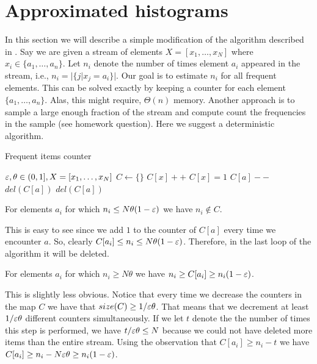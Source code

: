 \documentclass{article}
\begin{document}

\section{Approximated histograms}
In this section we will describe a simple modification of the algorithm described in \cite{Karp03asimple}.
Say we are given a stream of elements $X = [x_1,\ldots,x_N]$ where $x_i \in \{a_1,\ldots,a_n\}$.
Let $n_i$ denote the number of times element $a_i$ appeared in the stream, i.e., $n_i = |\{ j | x_j = a_i \}|$.
Our goal is to estimate $n_i$ for all frequent elements.
This can be solved exactly by keeping a counter for each element $\{a_1,\ldots,a_n\}$. 
Alas, this might require, $\Theta(n)$ memory. 
Another approach is to sample a large enough fraction of
the stream and compute count the frequencies in the sample (see homework question).
Here we suggest a deterministic algorithm.
%
\begin{algorithm}
\caption{Frequent items counter}
\begin{algorithmic}
 $\varepsilon,\theta \in (0,1], X = [x_1,\ldots,x_N]$
\STATE $C \leftarrow \{ \}$
		\STATE $C[x] ++$
		\STATE $C[x] = 1$
	\ELSE
			\STATE $C[a] --$
			 	\STATE $del(C[a])$
			\ENDIF
		\ENDFOR
	\ENDIF		
\ENDFOR
{}
		\STATE $del(C[a])$
	\ENDIF
\ENDFOR
\end{algorithmic}
\end{algorithm}
%
\begin{claim}
For elements $a_i$ for which $n_i \le N\theta(1-\varepsilon)$ we have $n_i \not\in C$.
\end{claim}
This is easy to see since we add $1$ to the counter of $C[a]$ every time we encounter $a$.
So, clearly $C[a_i] \le n_i \le N\theta(1-\varepsilon)$. Therefore, in the last loop of the algorithm it will be deleted.
\begin{claim}
For elements $a_i$ for which $n_i \ge N\theta$ we have $n_i \ge C[a_i] \ge n_i(1-\varepsilon)$.
\end{claim}
This is slightly less obvious.
Notice that every time we decrease the counters in the map $C$ we have that $size(C) \ge 1/\varepsilon\theta$.
That means that we decrement at least $1/\varepsilon\theta$ different counters simultaneously. 
If we let $t$ denote the the number of times 
this step is performed, we have $t/\varepsilon\theta \le N$ because we could not have deleted more items than the entire stream.
Using the observation that $C[a_i] \ge n_i - t$ we have $C[a_i] \ge n_i - N\varepsilon\theta \ge n_i(1-\varepsilon)$.
\end{document}

